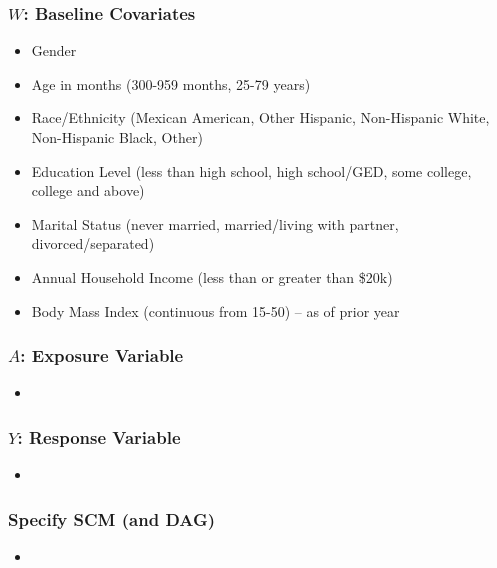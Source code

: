 \documentclass{beamer}
\begin{document}
\begin{frame}
\frametitle{$W$: Baseline Covariates}
   \begin{itemize}
   \item Gender \\
   \item Age in months (300-959 months, 25-79 years) \\
   \item Race/Ethnicity (Mexican American, Other Hispanic, Non-Hispanic White, Non-Hispanic Black, Other) \\
   \item Education Level (less than high school, high school/GED, some college, college and above) \\
   \item Marital Status (never married, married/living with partner, divorced/separated) \\
   \item Annual Household Income (less than or greater than \$20k) \\
   \item Body Mass Index (continuous from 15-50) -- as of prior year \\
  \end{itemize}

\end{frame}

\begin{frame}
 \frametitle{$A$: Exposure Variable}
  \begin{itemize}
    \item 
  \end{itemize}

\end{frame}

\begin{frame}
 \frametitle{$Y$: Response Variable}
  \begin{itemize}
    \item 
  \end{itemize}

\end{frame}

\begin{frame}
 \frametitle{Specify  SCM (and DAG)}
  \begin{itemize}
    \item 
  \end{itemize}

\end{frame}
\end{document}
